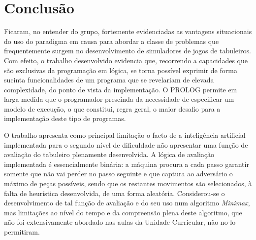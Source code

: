 \documentclass[a4paper]{article}
\begin{document}
\section{Conclusão}
Ficaram, no entender do grupo, fortemente evidenciadas as vantagens situacionais do uso do paradigma em causa para abordar a classe de problemas que frequentemente surgem no desenvolvimento de simuladores de jogos de tabuleiros. Com efeito, o trabalho desenvolvido evidencia que, recorrendo a capacidades que são exclusivas da programação em lógica, se torna possível exprimir de forma sucinta funcionalidades de um programa que se revelariam de elevada complexidade, do ponto de vista da implementação. O PROLOG permite em larga medida que o programador prescinda da necessidade de especificar um modelo de execução, o que constitui, regra geral, o maior desafio para a implementação deste tipo de programas.

O trabalho apresenta como principal limitação o facto de a inteligência artificial implementada para o segundo nível de dificuldade não apresentar uma função de avaliação do tabuleiro plenamente desenvolvida. A lógica de avaliação implementada é essencialmente binária: a máquina procura a cada passo garantir somente que não vai perder no passo seguinte e que captura ao adversário o máximo de peças possíveis, sendo que os restantes movimentos são selecionados, à falta de heurística desenvolvida, de uma forma aleatória. Considerou-se o desenvolvimento de tal função de avaliação e do seu uso num algoritmo \textit{Minimax}, mas limitações ao nível do tempo e da compreensão plena deste algoritmo, que não foi extensivamente abordado nas aulas da Unidade Curricular, não no-lo permitiram.
\end{document}
